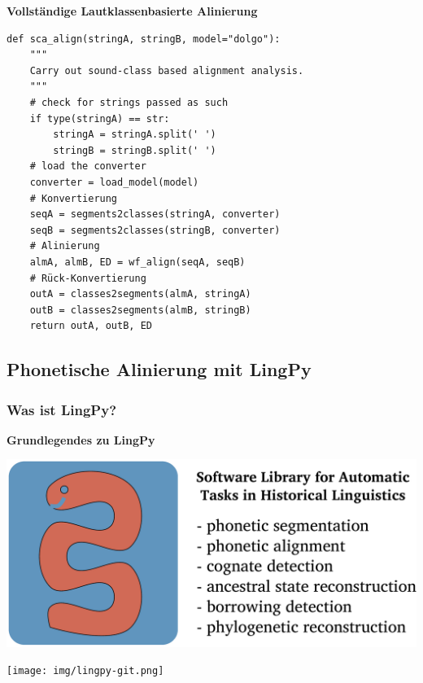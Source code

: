 \vspace{0.5cm}\par\noindent\textbf{Vollständige Lautklassenbasierte Alinierung}\vspace{0.5cm}

\begin{verbatim}
def sca_align(stringA, stringB, model="dolgo"):
    """
    Carry out sound-class based alignment analysis.
    """
    # check for strings passed as such 
    if type(stringA) == str:
        stringA = stringA.split(' ')
        stringB = stringB.split(' ')
    # load the converter
    converter = load_model(model)
    # Konvertierung
    seqA = segments2classes(stringA, converter)
    seqB = segments2classes(stringB, converter)
    # Alinierung
    almA, almB, ED = wf_align(seqA, seqB)
    # Rück-Konvertierung
    outA = classes2segments(almA, stringA)
    outB = classes2segments(almB, stringB)
    return outA, outB, ED
\end{verbatim}


\subsection{Phonetische Alinierung mit LingPy}
\subsubsection{\texorpdfstring{{Was ist LingPy?}}{Was ist LingPy?}}

\vspace{0.5cm}\par\noindent\textbf{Grundlegendes zu LingPy}\vspace{0.5cm}

\includegraphics[width=\textwidth]{img/lingpy.pdf}






\texttt{[image: img/lingpy-git.png]}


